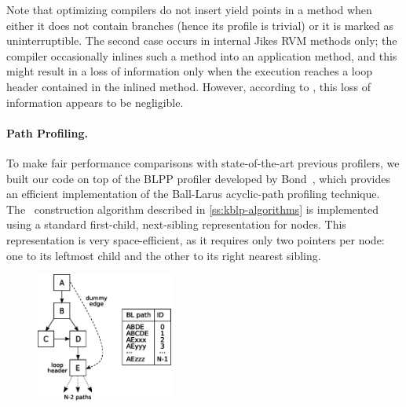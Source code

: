 Note that optimizing compilers do not insert yield points in a method when either it does not contain branches (hence its profile is trivial) or it is marked as uninterruptible. The second case occurs in internal Jikes RVM methods only; the compiler occasionally inlines such a method into an application method, and this might result in a loss of information only when the execution reaches a loop header contained in the inlined method. However, according to \cite{Bond05}, this loss of information appears to be negligible.

\paragraph*{Path Profiling.} To make fair performance comparisons with state-of-the-art previous profilers, we built our code on top of the BLPP profiler developed by Bond~\cite{Bond05,PEP}, which provides an efficient implementation of the Ball-Larus acyclic-path profiling technique. The \ksf\ construction algorithm described in \mysection\ref{ss:kblp-algorithms} is implemented using a standard first-child, next-sibling representation for nodes. This representation is very space-efficient, as it requires only two pointers per node: one to its leftmost child and the other to its right nearest sibling. %

\ifdefined\noauthorea
\begin{figure}[!ht]
\begin{center}
\includegraphics[width=0.4\textwidth]{figures/kblpp-example-fewer/kblpp-example-fewer.eps}
\caption{\protect}
\end{center}
\end{figure}
\fi

